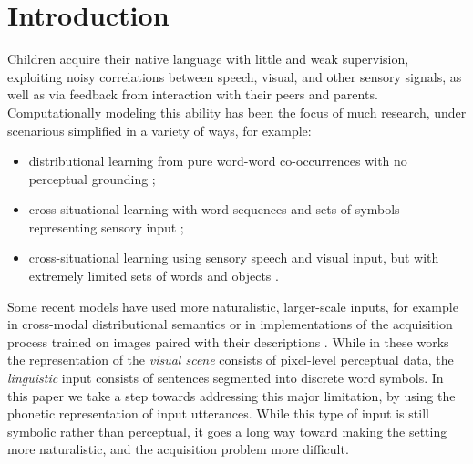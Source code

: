 \section{Introduction}
\label{sec:intro}

Children acquire their native language with little and weak
supervision, exploiting noisy correlations between speech, visual, and
other sensory signals, as well as via feedback from interaction with
their peers and parents. Computationally modeling this ability has
been the focus of much research, under scenarious simplified
in a variety of ways, for example:

\begin{itemize}
\item distributional learning from pure word-word co-occurrences with
  no perceptual grounding \cite{landauer1998introduction,kiros2015skip};
\item cross-situational learning with word sequences and sets of
  symbols representing sensory input
  \cite{siskind.96,fazly.etal.10csj};
\item cross-situational learning using sensory speech and visual
  input, but with extremely limited sets of words and objects
  \cite{Roy2002113,iwahashi2003language}.
\end{itemize}

Some recent models have used more naturalistic, larger-scale inputs,
for example in cross-modal distributional semantics
\cite{lazaridou2015combining} or in implementations of the
acquisition process trained on images paired with their descriptions
\cite{chrupala2015learning}. While in these
works the representation of the {\it visual scene} consists of
pixel-level perceptual data, the {\it linguistic} input consists of
sentences segmented into discrete word symbols. In this paper we take
a step towards addressing this major limitation, by using the phonetic
representation of input utterances. While this type of input is still
symbolic rather than perceptual, it goes a long way toward making the
setting more naturalistic, and the acquisition problem more difficult.
